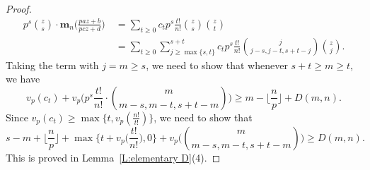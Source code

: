 \documentclass[12pt]{amsart}
\theoremstyle{definition}
\numberwithin{equation}{subsection}
\def\bfm{\mathbf{m}}
\begin{document}
\begin{proof}
\begin{align*}
p^s \binom zs \cdot \bfm_n\Big( \frac{paz+b}{pcz+d}\Big) \ &= \sum_{t \geq 0}  c_tp^s \frac{t!}{n!} \binom zs \binom zt
\\
\ & = \sum_{t \geq 0} \sum_{j \geq \max\{s,t\}}^{s+t} c_t p^s \frac {t!}{n!} \binom{j}{j-s, j-t,s+t-j} \binom zj.
\end{align*}
Taking the term with $j = m\geq s$, we need to show that whenever $s+t \geq m\geq t$, we have
$$
v_p(c_t) + v_p \Big( p^{s} \frac{t!}{n!} \cdot \binom m{m-s, m-t, s+t-m} \Big) \geq m-\Big\lfloor \frac np\Big \rfloor + D(m,n).
$$
Since $v_p(c_t) \geq \max \{t, v_p(\frac{n!}{t!})\}$, we need to show that
$$
s-m + \Big\lfloor\frac np\Big\rfloor+\max \Big\{t+v_p \Big( \frac{t!}{n!}\Big), 0\Big\} +v_p \Big( \binom m{m-s, m-t, s+t-m} \Big) \geq D(m,n).
$$
This is proved in Lemma~\ref{L:elementary D}(4).
\end{proof}
\end{document}
